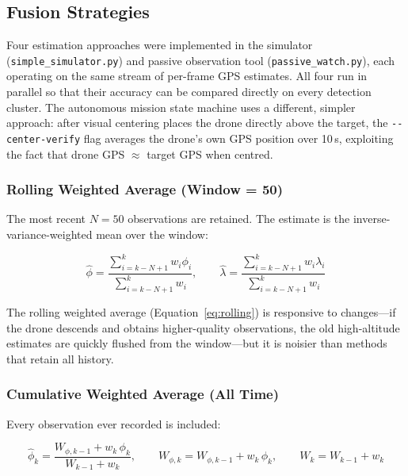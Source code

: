\subsection{Fusion Strategies}\label{sec:fusion-strategies}

Four estimation approaches were implemented in the simulator (\texttt{simple\_simulator.py}) and passive observation tool (\texttt{passive\_watch.py}), each operating on the same stream of per-frame GPS estimates.  All four run in parallel so that their accuracy can be compared directly on every detection cluster.  The autonomous mission state machine uses a different, simpler approach: after visual centering places the drone directly above the target, the \texttt{-{}-center-verify} flag averages the drone's own GPS position over 10\,s, exploiting the fact that drone GPS $\approx$ target GPS when centred.

\subsubsection{Rolling Weighted Average (Window = 50)}

The most recent $N = 50$ observations are retained.  The estimate is the inverse-variance-weighted mean over the window:

\begin{equation}\label{eq:rolling}
  \hat{\phi} = \frac{\sum_{i=k-N+1}^{k} w_i \phi_i}{\sum_{i=k-N+1}^{k} w_i},
  \qquad
  \hat{\lambda} = \frac{\sum_{i=k-N+1}^{k} w_i \lambda_i}{\sum_{i=k-N+1}^{k} w_i}
\end{equation}

\noindent The rolling weighted average (Equation~\ref{eq:rolling}) is responsive to changes---if the drone descends and obtains higher-quality observations, the old high-altitude estimates are quickly flushed from the window---but it is noisier than methods that retain all history.

\subsubsection{Cumulative Weighted Average (All Time)}

Every observation ever recorded is included:

\begin{equation}\label{eq:cumulative}
  \hat{\phi}_k = \frac{W_{\phi,k-1} + w_k\,\phi_k}{W_{k-1} + w_k},
  \qquad
  W_{\phi,k} = W_{\phi,k-1} + w_k\,\phi_k,
  \qquad
  W_k = W_{k-1} + w_k
\end{equation}

